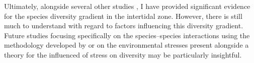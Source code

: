 \documentclass[11pt]{article}
\begin{document}
	Ultimately, alongside several other studies \parencite[e.g., ][]{Armonies:2000,McLachlan:2006}, I have provided significant evidence for the species diversity gradient in the intertidal zone. However, there is still much to understand with regard to factors influencing this diversity gradient. Future studies focusing specifically on the species--species interactions using the methodology developed by \textcite{Novak:2010} or on the environmental stresses present alongside a theory for the influenced of stress on diversity \parencite{Scrosati:2011} may be particularly insightful.
	
	\printbibliography
	
	
	
\end{document}
